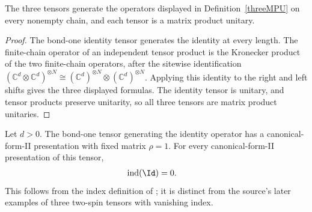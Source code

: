 \begin{lemma}
    \label{thm:threeMPU_chain_formulas}
    \leanok
    The three tensors generate the operators displayed in
    Definition~\ref{threeMPU} on every nonempty chain, and each tensor is a
    matrix product unitary.
\end{lemma}

\begin{proof}\leanok
    The bond-one identity tensor generates the identity at every length.  The
    finite-chain operator of an independent tensor product is the Kronecker
    product of the two finite-chain operators, after the sitewise identification
    $(\mathbb C^d\otimes\mathbb C^d)^{\otimes N}
        \cong(\mathbb C^d)^{\otimes N}\otimes(\mathbb C^d)^{\otimes N}$.  Applying
    this identity to the right and left shifts gives the three displayed
    formulas.  The identity tensor is unitary, and tensor products preserve
    unitarity, so all three tensors are matrix product unitaries.
\end{proof}

\begin{lemma}
    \label{thm:mpu_identity_index}
    \leanok
    Let $d>0$. The bond-one tensor generating the identity operator has a
    canonical-form-II presentation with fixed matrix $\rho=1$. For every
    canonical-form-II presentation of this tensor,
    \begin{align}
        \operatorname{ind}(\Id) & =0.
    \end{align}
    This follows from the index definition of
    \cite[Definition~IV.1]{Cirac2017MPU}; it is distinct from the source's
    later examples of three two-spin tensors with vanishing index.
\end{lemma}

